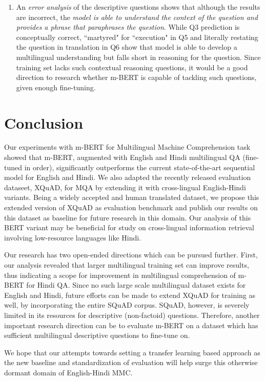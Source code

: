 \documentclass[acmsmall]{acmart}
\begin{document}
\begin{enumerate}
    \item An \textit{error analysis} of the descriptive questions shows that although the results are incorrect, the \textit{model is able to understand the context of the question and provides a phrase that paraphrases the question}. While Q3 prediction is conceptually correct, ``martyred" for ``execution" in Q5 and literally restating the question in translation in Q6 show that model is able to develop a multilingual understanding but falls short in reasoning for the question. Since training set lacks such contextual reasoning questions, it would be a good direction to research whether m-BERT is capable of tackling such questions, given enough fine-tuning. 
    
\end{enumerate}
\section{Conclusion}

\par Our experiments with m-BERT for Multilingual Machine Comprehension task showed that m-BERT, augmented with English and Hindi multilingual QA (fine-tuned in order), significantly outperforms the current state-of-the-art sequential model \cite{latestMQA} for English and Hindi. We also adapted the recently released evaluation dataseet, XQuAD, for MQA by extending it with cross-lingual English-Hindi variants. Being a widely accepted and human translated dataset, we propose this extended version of XQuAD as evaluation benchmark and publish our results on this dataset as baseline for future research in this domain. Our analysis of this BERT variant may be beneficial for study on cross-lingual information retrieval involving low-resource languages like Hindi. 
\par Our research has two open-ended directions which can be pursued further. First, our analysis revealed that larger multilingual training set can improve results, thus indicating a scope for improvement in  multilingual comprehension of m-BERT for Hindi QA. Since no such large scale multilingual dataset exists for English and Hindi, future efforts can be made to extend XQuAD for training as well, by incorporating the entire SQuAD corpus. SQuAD, however, is severely limited in its resources for descriptive (non-factoid) questions. Therefore, another important research direction can be to evaluate m-BERT on a dataset which has sufficient multilingual descriptive questions to fine-tune on. 

\par We hope that our attempts towards setting a transfer learning based approach as the new baseline and standardization of evaluation will help surge this otherwise dormant domain of English-Hindi MMC. 
 

 



\end{document}
